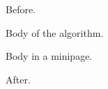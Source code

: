\documentclass{article}
\begin{document}
Before.
\begin{algorithm}
\caption{Euclid}
Body of the algorithm.
\end{algorithm}
\begin{algorithm}[t]
\caption[Short]{Second one}
\begin{minipage}{3in}
Body in a minipage.
\end{minipage}
\end{algorithm}
After.
\end{document}
